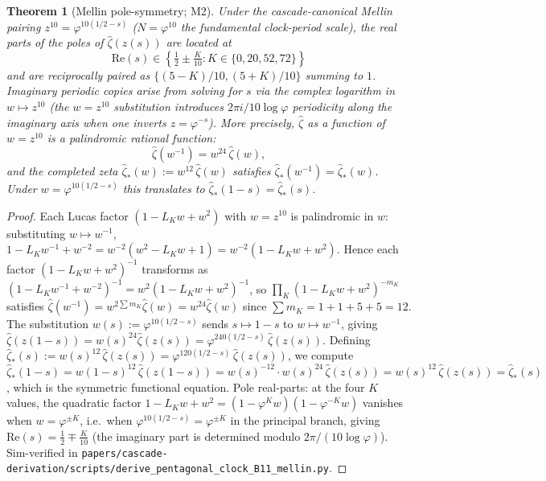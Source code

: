 \documentclass[11pt, a4paper]{amsart}
\newtheorem{theorem}{Theorem}[section]
\theoremstyle{definition}
\begin{document}
\begin{theorem}[Mellin pole-symmetry; M2]\label{thm:zhat_sym}
Under the cascade-canonical Mellin pairing $z^{10} = \varphi^{10(1/2-s)}$
($N = \varphi^{10}$ the fundamental clock-period scale), the
\emph{real parts} of the poles of $\widehat\zeta(z(s))$ are located at
\[
\mathrm{Re}(s) \in \left\{\tfrac{1}{2} \pm \tfrac{K}{10} : K \in \{0, 20, 52, 72\}\right\}
\]
and are reciprocally paired as $\{(5-K)/10, (5+K)/10\}$ summing to
$1$.  Imaginary periodic copies arise from solving for $s$ via the
complex logarithm in $w \mapsto z^{10}$ (the $w = z^{10}$
substitution introduces $2\pi i / 10\log\varphi$ periodicity along
the imaginary axis when one inverts $z = \varphi^{-s}$).  More precisely,
$\widehat\zeta$ as a function of $w = z^{10}$ is a palindromic
rational function:
\[
\widehat\zeta(w^{-1}) = w^{24}\,\widehat\zeta(w),
\]
and the completed zeta
$\widehat\zeta_\ast(w) := w^{12}\,\widehat\zeta(w)$
satisfies $\widehat\zeta_\ast(w^{-1}) = \widehat\zeta_\ast(w)$.
Under $w = \varphi^{10(1/2-s)}$ this translates to
$\widehat\zeta_\ast(1-s) = \widehat\zeta_\ast(s)$.
\end{theorem}

\begin{proof}
Each Lucas factor $(1 - L_K w + w^2)$ with $w = z^{10}$ is
palindromic in $w$: substituting $w \mapsto w^{-1}$,
$1 - L_K w^{-1} + w^{-2} = w^{-2}(w^2 - L_K w + 1)
= w^{-2}(1 - L_K w + w^2)$.
Hence each factor $(1 - L_K w + w^2)^{-1}$ transforms as
$(1 - L_K w^{-1} + w^{-2})^{-1} = w^2 (1 - L_K w + w^2)^{-1}$,
so $\prod_K (1 - L_K w + w^2)^{-m_K}$ satisfies
$\widehat\zeta(w^{-1}) = w^{2 \sum m_K} \widehat\zeta(w)
= w^{24} \widehat\zeta(w)$
since $\sum m_K = 1 + 1 + 5 + 5 = 12$.  The substitution
$w(s) := \varphi^{10(1/2-s)}$ sends $s \mapsto 1-s$ to
$w \mapsto w^{-1}$, giving
$\widehat\zeta(z(1-s)) = w(s)^{24} \widehat\zeta(z(s))
= \varphi^{240(1/2-s)}\,\widehat\zeta(z(s))$.
Defining $\widehat\zeta_\ast(s) := w(s)^{12}\,\widehat\zeta(z(s))
= \varphi^{120(1/2-s)}\,\widehat\zeta(z(s))$, we compute
$\widehat\zeta_\ast(1-s) = w(1-s)^{12}\,\widehat\zeta(z(1-s))
= w(s)^{-12} \cdot w(s)^{24}\,\widehat\zeta(z(s))
= w(s)^{12}\,\widehat\zeta(z(s)) = \widehat\zeta_\ast(s)$,
which is the symmetric functional equation.  Pole real-parts: at the four $K$ values, the
quadratic factor $1 - L_K w + w^2 = (1 - \varphi^K w)(1 - \varphi^{-K} w)$
vanishes when $w = \varphi^{\pm K}$, i.e.\ when
$\varphi^{10(1/2-s)} = \varphi^{\pm K}$ in the principal branch,
giving $\mathrm{Re}(s) = \tfrac{1}{2} \mp \tfrac{K}{10}$ (the
imaginary part is determined modulo $2\pi/(10 \log\varphi)$).
Sim-verified in
\texttt{papers/cascade-derivation/scripts/derive\_pentagonal\_clock\_B11\_mellin.py}.
\end{proof}
\end{document}
